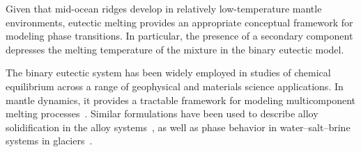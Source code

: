 Given that mid-ocean ridges develop in relatively low-temperature mantle environments, 
eutectic melting provides an appropriate conceptual framework for modeling phase transitions.
In particular, the presence of a secondary component depresses the melting temperature
of the mixture in the binary eutectic model.


The binary eutectic system has been widely employed in studies of chemical equilibrium across a 
range of geophysical and materials science applications. In mantle dynamics, it provides a tractable 
framework for modeling multicomponent melting processes~\cite{GenerationCompositionPartialMelts}. 
Similar formulations have been used to describe alloy solidification in the alloy 
systems~\cite{eutecticsolidification}, 
as well as phase behavior in water–salt–brine systems in glaciers~\cite{DownwardOxidantTransport}.

